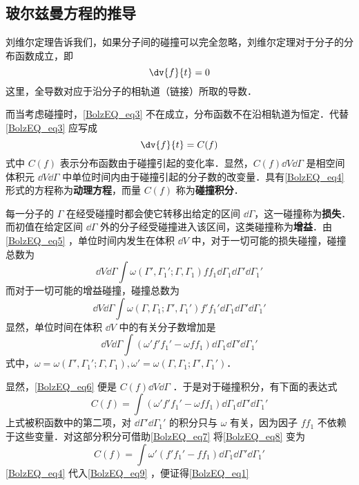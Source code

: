 \subsection{玻尔兹曼方程的推导}
 刘维尔定理告诉我们，如果分子间的碰撞可以完全忽略，刘维尔定理对于分子的分布函数成立，即
 \begin{equation}\label{BolzEQ_eq3}
 \dv{f}{t}=0
 \end{equation}
 这里，全导数对应于沿分子的相轨道（链接）所取的导数．

 而当考虑碰撞时，\autoref{BolzEQ_eq3} 不在成立，分布函数不在沿相轨道为恒定．代替\autoref{BolzEQ_eq3} 应写成
 \begin{equation}\label{BolzEQ_eq4}
 \dv{f}{t}=C(f)
 \end{equation}
 式中 $C(f)$ 表示分布函数由于碰撞引起的变化率．显然，$C(f)\dd V\dd\Gamma$ 是相空间体积元 $\dd V\dd\Gamma$ 中单位时间内由于碰撞引起的分子数的改变量．具有\autoref{BolzEQ_eq4} 形式的方程称为\textbf{动理方程}，而量 $C(f)$ 称为\textbf{碰撞积分}．

 每一分子的 $\Gamma$ 在经受碰撞时都会使它转移出给定的区间 $\dd\Gamma$，这一碰撞称为\textbf{损失}．而初值在给定区间 $\dd \Gamma$ 外的分子经受碰撞进入该区间，这类碰撞称为\textbf{增益}．由\autoref{BolzEQ_eq5} ，单位时间内发生在体积 $\dd V$ 中，对于一切可能的损失碰撞，碰撞总数为
 \begin{equation}
 \dd V\dd \Gamma\int\omega(\Gamma',\Gamma_1';\Gamma,\Gamma_1)ff_1\dd\Gamma_1\dd\Gamma'\dd\Gamma_1'
 \end{equation}
  而对于一切可能的增益碰撞，碰撞总数为
  \begin{equation}
  \dd V\dd \Gamma\int\omega(\Gamma,\Gamma_1;\Gamma',\Gamma_1')f'f_1'\dd\Gamma_1\dd\Gamma'\dd\Gamma_1'
  \end{equation}
  显然，单位时间在体积 $\dd V$ 中的有关分子数增加是
  \begin{equation}\label{BolzEQ_eq6}
  \dd V\dd \Gamma\int(\omega'f'f_1'-\omega f f_1)\dd\Gamma_1\dd\Gamma'\dd\Gamma_1'
  \end{equation}
  式中，$\omega=\omega(\Gamma',\Gamma_1';\Gamma,\Gamma_1),\omega'=\omega(\Gamma,\Gamma_1;\Gamma',\Gamma_1')$．

显然，\autoref{BolzEQ_eq6} 便是 $C(f)\dd V\dd\Gamma$ ．于是对于碰撞积分，有下面的表达式
\begin{equation}\label{BolzEQ_eq8}
C(f)=\int(\omega'f'f_1'-\omega f f_1)\dd\Gamma_1\dd\Gamma'\dd\Gamma_1'
\end{equation}
上式被积函数中的第二项，对 $\dd\Gamma'\dd\Gamma_1'$ 的积分只与 $\omega$ 有关，因为因子 $ff_1$ 不依赖于这些变量．对这部分积分可借助\autoref{BolzEQ_eq7} 将\autoref{BolzEQ_eq8} 变为
\begin{equation}\label{BolzEQ_eq9}
C(f)=\int\omega'(f'f_1'- f f_1)\dd\Gamma_1\dd\Gamma'\dd\Gamma_1'
\end{equation}
\autoref{BolzEQ_eq4} 代入\autoref{BolzEQ_eq9} ，便证得\autoref{BolzEQ_eq1} 